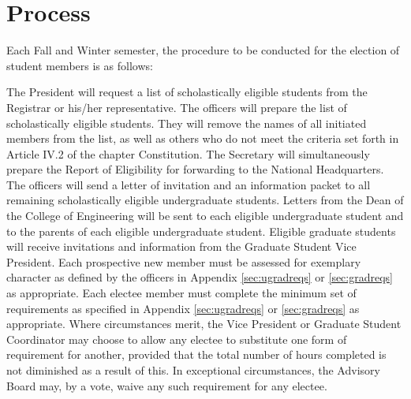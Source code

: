 \section{Process} Each Fall and Winter semester, the procedure to be conducted for the election of student members is as follows:
\begin{enumsubsection}
\itemnotoc  The President will request a list of scholastically eligible students from the Registrar  or his/her representative.
\itemnotoc The officers will prepare the list of scholastically eligible students. They will remove the names of all initiated members from the list, as well as others who do not meet the criteria set forth in Article IV.2 of the chapter Constitution. The Secretary will simultaneously prepare the Report of Eligibility for forwarding to the National Headquarters.
\itemnotoc The officers will send a letter of invitation and an information packet to all remaining scholastically eligible undergraduate students.
\itemnotoc Letters from the Dean of the College of Engineering will be sent to each eligible undergraduate student and to the parents of each eligible undergraduate student.  Eligible graduate students will receive invitations and information from the Graduate Student Vice President.
\itemnotoc Each prospective new member must be assessed for exemplary character as defined by the officers in Appendix \ref{sec:ugradreqs} or \ref{sec:gradreqs} as appropriate. %
\itemnotoc  Each electee member must complete the minimum set of requirements as specified in Appendix \ref{sec:ugradreqs} or \ref{sec:gradreqs} as appropriate. Where circumstances merit, the Vice President or Graduate Student Coordinator may choose to allow any electee to substitute one form of requirement for another, provided that the total number of hours completed is not diminished as a result of this. In exceptional circumstances, the Advisory Board may, by a  vote, waive any such requirement for any electee.


\end{enumsubsection}
